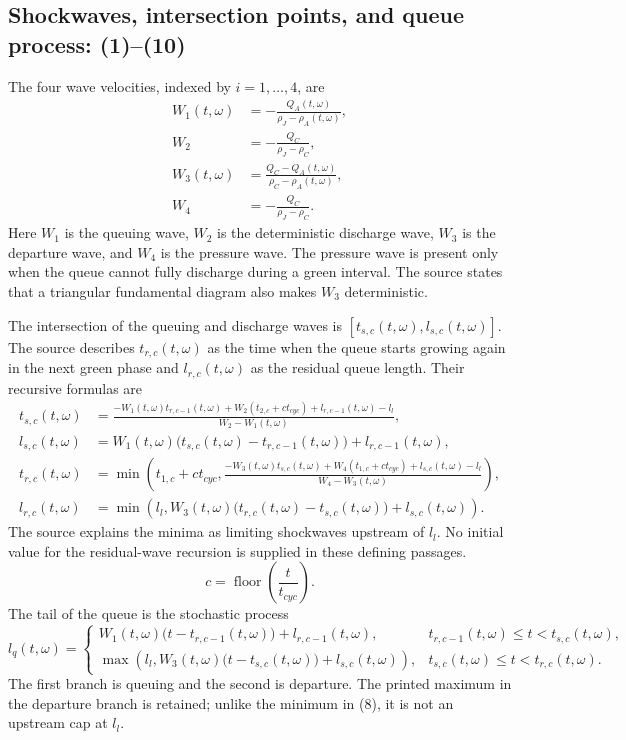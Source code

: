 \documentclass{article}
\begin{document}
\subsection*{Shockwaves, intersection points, and queue process: (1)--(10)}
The four wave velocities, indexed by \(i=1,\ldots,4\), are
\begin{align}
W_1(t,\omega)&=-\frac{Q_A(t,\omega)}{\rho_J-\rho_A(t,\omega)}, \tag{1}\\
W_2&=-\frac{Q_C}{\rho_J-\rho_C}, \tag{2}\\
W_3(t,\omega)&=\frac{Q_C-Q_A(t,\omega)}{\rho_C-\rho_A(t,\omega)}, \tag{3}\\
W_4&=-\frac{Q_C}{\rho_J-\rho_C}. \tag{4}
\end{align}
Here \(W_1\) is the queuing wave, \(W_2\) is the deterministic discharge wave, \(W_3\) is the departure wave, and \(W_4\) is the pressure wave. The pressure wave is present only when the queue cannot fully discharge during a green interval. The source states that a triangular fundamental diagram also makes \(W_3\) deterministic.

The intersection of the queuing and discharge waves is \([t_{s,c}(t,\omega),l_{s,c}(t,\omega)]\). The source describes \(t_{r,c}(t,\omega)\) as the time when the queue starts growing again in the next green phase and \(l_{r,c}(t,\omega)\) as the residual queue length. Their recursive formulas are
\begin{align}
t_{s,c}(t,\omega)
&=\frac{-W_1(t,\omega)t_{r,c-1}(t,\omega)
+W_2(t_{2,c}+ct_{cyc})+l_{r,c-1}(t,\omega)-l_l}
{W_2-W_1(t,\omega)}, \tag{5}\\
l_{s,c}(t,\omega)
&=W_1(t,\omega)\bigl(t_{s,c}(t,\omega)-t_{r,c-1}(t,\omega)\bigr)
+l_{r,c-1}(t,\omega), \tag{6}\\
t_{r,c}(t,\omega)
&=\min\left(
 t_{1,c}+ct_{cyc},
 \frac{-W_3(t,\omega)t_{s,c}(t,\omega)
 +W_4(t_{1,c}+ct_{cyc})+l_{s,c}(t,\omega)-l_l}
 {W_4-W_3(t,\omega)}
\right), \tag{7}\\
l_{r,c}(t,\omega)
&=\min\left(l_l,
W_3(t,\omega)\bigl(t_{r,c}(t,\omega)-t_{s,c}(t,\omega)\bigr)
+l_{s,c}(t,\omega)\right). \tag{8}
\end{align}
The source explains the minima as limiting shockwaves upstream of \(l_l\). No initial value for the residual-wave recursion is supplied in these defining passages.
\begin{equation}
c=\operatorname{floor}\left(\frac{t}{t_{cyc}}\right).
\tag{9}
\end{equation}
The tail of the queue is the stochastic process
\begin{equation}
l_q(t,\omega)=
\begin{cases}
W_1(t,\omega)\bigl(t-t_{r,c-1}(t,\omega)\bigr)+l_{r,c-1}(t,\omega),
& t_{r,c-1}(t,\omega)\leq t<t_{s,c}(t,\omega),\\[2mm]
\max\left(l_l,W_3(t,\omega)\bigl(t-t_{s,c}(t,\omega)\bigr)+l_{s,c}(t,\omega)\right),
& t_{s,c}(t,\omega)\leq t<t_{r,c}(t,\omega).
\end{cases}
\tag{10}
\end{equation}
The first branch is queuing and the second is departure. The printed maximum in the departure branch is retained; unlike the minimum in (8), it is not an upstream cap at \(l_l\).
\end{document}
